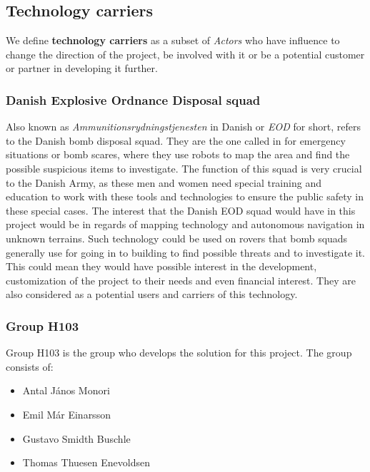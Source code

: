 \subsection{Technology carriers}
We define \textbf{technology carriers} as a subset of \textit{Actors} who have influence to change the direction of the project, be involved with it or be a potential customer or partner in developing it further.

\subsubsection{Danish Explosive Ordnance Disposal squad} 
Also known as \textit{Ammunitionsrydningstjenesten} in Danish or \textit{EOD} for short, refers to the Danish bomb disposal squad\cite{EOD}. They are the one called in for emergency situations or bomb scares, where they use robots to map the area and find the possible suspicious items to investigate. The function of this squad is very crucial to the Danish Army, as these men and women need special training and education to work with these tools and technologies to ensure the public safety in these special cases. The interest that the Danish EOD squad would have in this project would be in regards of mapping technology and autonomous navigation in unknown terrains. Such technology could be used on rovers that bomb squads generally use for going in to building to find possible threats and to investigate it. This could mean they would have possible interest in the development, customization of the project to their needs and even financial interest. They are also considered as a potential users and carriers of this technology.

\subsubsection{Group H103}	
Group H103 is the group who develops the solution for this project. The group consists of:
\begin{itemize}
	\item Antal János Monori
	\item Emil Már Einarsson
	\item Gustavo Smidth Buschle
	\item Thomas Thuesen Enevoldsen
\end{itemize}


